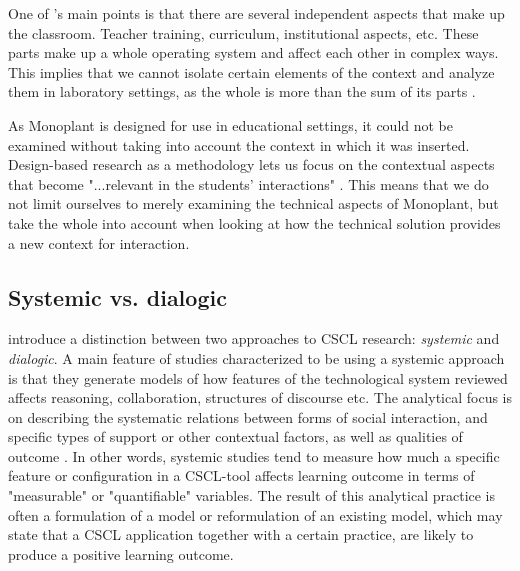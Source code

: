 One of \citeauthor{brown1992design}'s main points is that there are several independent aspects that make up the classroom. Teacher training, curriculum, institutional aspects, etc. These parts make up a whole operating system and affect each other in complex ways. This implies that we cannot isolate certain elements of the context and analyze them in laboratory settings, as the whole is more than the sum of its parts \citep{brown1992design}.


As Monoplant is designed for use in educational settings, it could not be examined without taking into account the context in which it was inserted. Design-based research as a methodology lets us focus on the contextual aspects that become "...relevant in the students' interactions" \citep[p. 270]{krange2009historical}. This means that we do not limit ourselves to merely examining the technical aspects of Monoplant, but take the whole into account when looking at how the technical solution provides a new context for interaction. 

\subsection{Systemic vs. dialogic}
\citet{arnseth2006approaching} introduce a distinction between two approaches to CSCL research: \emph{systemic} and \emph{dialogic}. A main feature of studies characterized to be using a systemic approach is that they generate models of how features of the technological system reviewed affects reasoning, collaboration, structures of discourse etc. The analytical focus is on describing the systematic relations between forms of social interaction, and specific types of support or other contextual factors, as well as qualities of outcome \citep{arnseth2006approaching}. In other words, systemic studies tend to measure how much a specific feature or configuration in a CSCL-tool affects learning outcome in terms of "measurable" or "quantifiable" variables. The result of this analytical practice is often a formulation of a model or reformulation of an existing model, which may state that a CSCL application together with a certain practice, are likely to produce a positive learning outcome.

